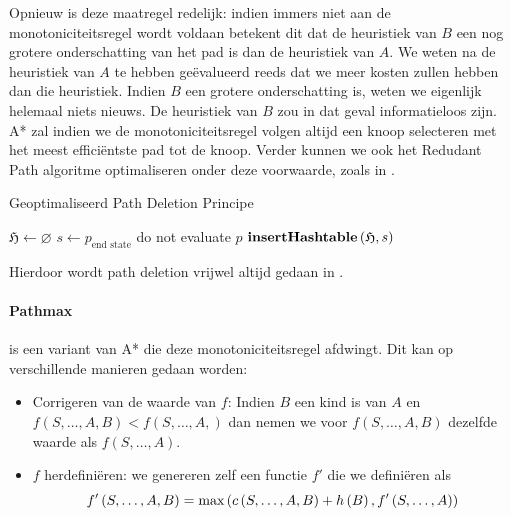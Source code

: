 Opnieuw is deze maatregel redelijk: indien immers niet aan de monotoniciteitsregel wordt voldaan betekent dit dat de heuristiek van $B$ een nog grotere onderschatting van het pad is dan de heuristiek van $A$. We weten na de heuristiek van $A$ te hebben ge\"evalueerd reeds dat we meer kosten zullen hebben dan die heuristiek. Indien $B$ een grotere onderschatting is, weten we eigenlijk helemaal niets nieuws. De heuristiek van $B$ zou in dat geval informatieloos zijn. A* zal indien we de monotoniciteitsregel volgen altijd een knoop selecteren met het meest effici\"entste pad tot de knoop. Verder kunnen we ook het Redudant Path algoritme optimaliseren onder deze voorwaarde, zoals in .
\begin{algorithm}[htb]                      %
\caption{Geoptimaliseerd Path Deletion Principe}          %
\label{alg:optimalPathDeletion}                           %
\begin{algorithmic}[1]                    %
\STATE ${\mathfrak H}\leftarrow\varnothing$
\STATE $s\leftarrow p_{\mbox{end state}}$
\STATE do not evaluate $p$
\ELSE
\STATE $\mbox{\bf insertHashtable}\left( {\mathfrak H},s \right)$
\ENDIF
\ENDIF
\end{algorithmic}
\end{algorithm}
Hierdoor wordt path deletion vrijwel altijd gedaan in .
\paragraph{Pathmax}
 is een variant van A* die deze monotoniciteitsregel afdwingt. Dit kan op verschillende manieren gedaan worden:
\begin{itemize}
 \item Corrigeren van de waarde van $f$: Indien $B$ een kind is van $A$ en $f\left(S,\ldots,A,B\right)<f\left(S,\ldots,A,\right)$ dan nemen we voor $f\left(S,\ldots,A,B\right)$ dezelfde waarde als $f\left(S,\ldots,A\right)$.
 \item $f$ herdefini\"eren: we genereren zelf een functie $f'$ die we defini\"eren als
\begin{equation}
f'\left(S,\ldots,A,B\right)=\mbox{max}\left( c\left(S,\ldots,A,B\right)+h\left(B\right),f'\left(S,\ldots,A\right) \right)
\end{equation}
\end{itemize}
